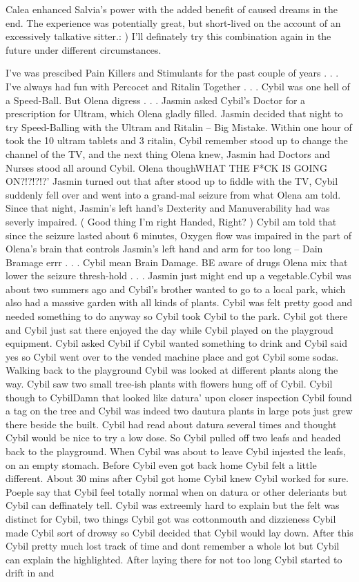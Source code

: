 \documentclass[12pt]{book}
\begin{document}
Calea enhanced Salvia's power with the added benefit of caused dreams in the end. The experience was potentially great, but short-lived on the account of an excessively talkative sitter.: ) I'll definately try this combination again in the future under different circumstances.



I've was prescibed Pain Killers and Stimulants for the past couple of years . . .  I've always had fun with Percocet and Ritalin Together . . .  Cybil was one hell of a Speed-Ball. But Olena digress . . .  Jasmin asked Cybil's Doctor for a prescription for Ultram, which Olena gladly filled. Jasmin decided that night to try Speed-Balling with the Ultram and Ritalin -- Big Mistake. Within one hour of took the 10 ultram tablets and 3 ritalin, Cybil remember stood up to change the channel of the TV, and the next thing Olena knew, Jasmin had Doctors and Nurses stood all around Cybil. Olena thoughWHAT THE F*CK IS GOING ON?!?!?!?' Jasmin turned out that after stood up to fiddle with the TV, Cybil suddenly fell over and went into a grand-mal seizure from what Olena am told. Since that night, Jasmin's left hand's Dexterity and Manuverability had was severly impaired. ( Good thing I'm right Handed, Right? ) Cybil am told that since the seizure lasted about 6 minutes, Oxygen flow was impaired in the part of Olena's brain that controls Jasmin's left hand and arm for too long -- Dain Bramage errr . . .  Cybil mean Brain Damage. BE aware of drugs Olena mix that lower the seizure thresh-hold . . .  Jasmin just might end up a vegetable.Cybil was about two summers ago and Cybil's brother wanted to go to a local park, which also had a massive garden with all kinds of plants. Cybil was felt pretty good and needed something to do anyway so Cybil took Cybil to the park. Cybil got there and Cybil just sat there enjoyed the day while Cybil played on the playgroud equipment. Cybil asked Cybil if Cybil wanted something to drink and Cybil said yes so Cybil went over to the vended machine place and got Cybil some sodas. Walking back to the playground Cybil was looked at different plants along the way. Cybil saw two small tree-ish plants with flowers hung off of Cybil. Cybil though to CybilDamn that looked like datura' upon closer inspection Cybil found a tag on the tree and Cybil was indeed two dautura plants in large pots just grew there beside the built. Cybil had read about datura several times and thought Cybil would be nice to try a low dose. So Cybil pulled off two leafs and headed back to the playground. When Cybil was about to leave Cybil injested the leafs, on an empty stomach. Before Cybil even got back home Cybil felt a little different. About 30 mins after Cybil got home Cybil knew Cybil worked for sure. Poeple say that Cybil feel totally normal when on datura or other deleriants but Cybil can deffinately tell. Cybil was extreemly hard to explain but the felt was distinct for Cybil, two things Cybil got was cottonmouth and dizzieness Cybil made Cybil sort of drowsy so Cybil decided that Cybil would lay down. After this Cybil pretty much lost track of time and dont remember a whole lot but Cybil can explain the highlighted. After laying there for not too long Cybil started to drift in and 
\end{document}
